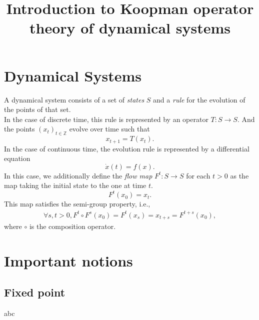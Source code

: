 \documentclass{article}
\def\Z{\mathbb{Z}}
\begin{document}
\title{Introduction to Koopman operator theory of dynamical systems}
\author{}
\date{}
\maketitle


\section{Dynamical Systems}%
\label{sec:dynamical_systems}

A dynamical system consists of a set of \textit{states}  $S$ and a
\textit{rule}  for the evolution of the points of that set.\\
In the case of discrete time, this rule is represented by an operator $T:S\to S$.
And the points $(x_t)_{t\in \Z}$ evolve over time such that
\[
    x_{t+1} = T(x_t).
\]
In the case of continuous time, the evolution rule is represented by a
differential equation
\[
    \dot x(t) = f(x).
\]
In this case, we additionally define the \textit{flow map} $F^t:S\to S$ for
each $t > 0$ as the map taking the initial state to the one at time $t$.
\[
    F^t(x_0) = x_t.
\]
This map satisfies the semi-group property, i.e.,
\begin{align*}
    \forall s, t > 0, F^t \circ F^s(x_0) = F^t(x_s) = x_{t+s} = F^{t+s}(x_0),
\end{align*}
where $\circ$ is the composition operator.

\section{Important notions}%
\label{sec:important_notions}

\subsection{Fixed point}%
\label{sub:fixed_point}

abc
\end{document}
